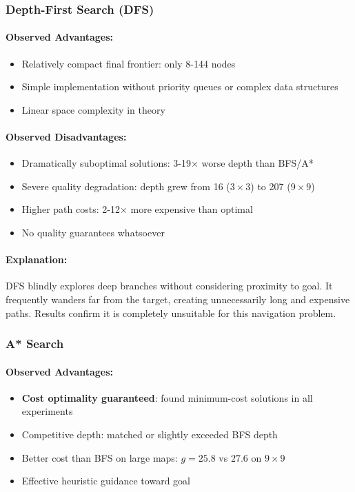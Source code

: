 \documentclass[11pt,a4paper]{article}
\begin{document}
\subsubsection{Depth-First Search (DFS)}

\paragraph{Observed Advantages:}
\begin{itemize}[leftmargin=1.5cm,itemsep=0.1em]
    \item Relatively compact final frontier: only 8-144 nodes
    \item Simple implementation without priority queues or complex data structures
    \item Linear space complexity in theory
\end{itemize}

\paragraph{Observed Disadvantages:}
\begin{itemize}[leftmargin=1.5cm,itemsep=0.1em]
    \item Dramatically suboptimal solutions: 3-19× worse depth than BFS/A*
    \item Severe quality degradation: depth grew from 16 ($3\times3$) to 207 ($9\times9$)
    \item Higher path costs: 2-12× more expensive than optimal
    \item No quality guarantees whatsoever
\end{itemize}

\paragraph{Explanation:}
DFS blindly explores deep branches without considering proximity to goal. It frequently wanders far from the target, creating unnecessarily long and expensive paths. Results confirm it is completely unsuitable for this navigation problem.

\subsubsection{A* Search}

\paragraph{Observed Advantages:}
\begin{itemize}[leftmargin=1.5cm,itemsep=0.1em]
    \item \textbf{Cost optimality guaranteed}: found minimum-cost solutions in all experiments
    \item Competitive depth: matched or slightly exceeded BFS depth
    \item Better cost than BFS on large maps: $g=25.8$ vs $27.6$ on $9\times9$
    \item Effective heuristic guidance toward goal
\end{itemize}
\end{document}
